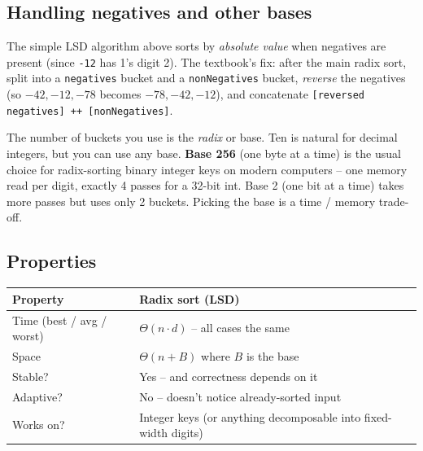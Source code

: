 \documentclass[11pt]{article}
\begin{document}
\subsection{Handling negatives and other bases}

\begin{examplebox}
The simple LSD algorithm above sorts by \emph{absolute value} when
negatives are present (since \texttt{-12} has 1's digit 2). The
textbook's fix: after the main radix sort, split into a
\texttt{negatives} bucket and a \texttt{nonNegatives} bucket,
\emph{reverse} the negatives (so $-42, -12, -78$ becomes
$-78, -42, -12$), and concatenate
\texttt{[reversed negatives] ++ [nonNegatives]}.
\end{examplebox}

\begin{notebox}[Radix = base]
The number of buckets you use is the \emph{radix} or base. Ten is
natural for decimal integers, but you can use any base.
\textbf{Base 256} (one byte at a time) is the usual choice for
radix-sorting binary integer keys on modern computers -- one memory
read per digit, exactly 4 passes for a 32-bit int. Base 2 (one bit
at a time) takes more passes but uses only 2 buckets. Picking the
base is a time / memory trade-off.
\end{notebox}

\subsection{Properties}

\begin{center}
\footnotesize
\renewcommand{\arraystretch}{1.3}
\begin{tabular}{@{}ll@{}}
\hline
\textbf{Property}  & \textbf{Radix sort (LSD)} \\
\hline
Time (best / avg / worst) & $\Theta(n \cdot d)$ -- all cases the same \\
Space              & $\Theta(n + B)$ where $B$ is the base \\
Stable?            & Yes -- and correctness depends on it \\
Adaptive?          & No -- doesn't notice already-sorted input \\
Works on?          & Integer keys (or anything decomposable into
                    fixed-width digits) \\
\hline
\end{tabular}
\end{center}
\end{document}
